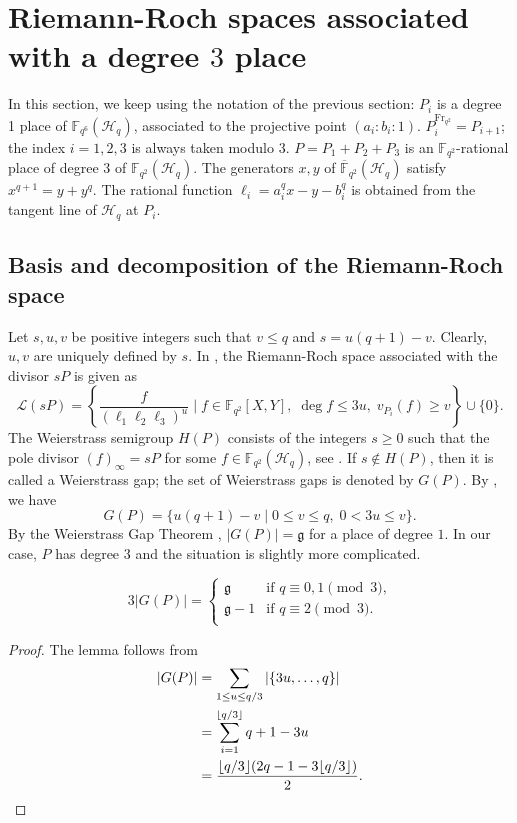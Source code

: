 \documentclass[entropy,article,submit,pdftex,moreauthors]{Definitions/mdpi}
\newcommand{\Frob}{{\mathrm{Fr}_{q^2}}}
\newcommand{\g}{\mathfrak{g}}
\begin{document}
\section{Riemann-Roch spaces associated with a degree $3$ place} \label{sec:riemann-roch}
In this section, we keep using the notation of the previous section: $P_i$ is a degree 1 place of $\mathbb{F}_{q^6}(\mathscr{H}_q)$, associated to the projective point $(a_i:b_i:1)$. $P_i^\Frob=P_{i+1}$; the index $i=1,2,3$ is always taken modulo $3$. $P=P_1+P_2+P_3$ is an $\mathbb{F}_{q^2}$-rational place of degree $3$ of $\mathbb{F}_{q^2}(\mathscr{H}_q)$. The generators $x,y$ of $\overline{\mathbb{F}}_{q^2}(\mathscr{H}_q)$ satisfy $x^{q+1}=y+y^q$. The rational function $\ell_i=a_i^qx-y-b_i^q$ is obtained from the tangent line of $\mathscr{H}_q$ at $P_i$. 

\subsection{Basis and decomposition of the Riemann-Roch space}
Let $s,u,v$ be positive integers such that $v\leq q$ and $s=u(q+1)-v$. Clearly, $u,v$ are uniquely defined by $s$. In \cite{korchmaros2013hermitian}, the Riemann-Roch space associated with the divisor $sP$ is given as
\[\mathscr{L}(sP) = \left\{ \frac{f}{(\ell_1\ell_2\ell_3)^u} \mid f \in \mathbb{F}_{q^2}[X,Y], \; \deg f \leq 3u, \; v_{P_i}(f) \geq v \right\} \cup \{0\}.\]
The Weierstrass semigroup $H(P)$ consists of the integers $s\geq 0$ such that the pole divisor $(f)_\infty=sP$ for some $f\in {\mathbb{F}_{q^2}}(\mathscr{H}_q)$, see \cite{beelen2023weierstrass}. If $s\not\in H(P)$, then it is called a Weierstrass gap; the set of Weierstrass gaps is denoted by $G(P)$. By \cite[Theorem 3.1]{korchmaros2013hermitian}, we have
\[G(P) = \{u(q+1)-v \mid 0\leq v\leq q, \; 0<3u\leq v\}.\]
By the Weierstrass Gap Theorem \cite[Theorem 1.6.8]{stichtenoth2009algebraic}, $|G(P)|=\g$ for a place of degree $1$. In our case, $P$ has degree $3$ and the situation is slightly more complicated.

\begin{Lemma} \label{lm:GP-size}
\[3|G(P)| = \begin{cases}
\g & \text{if $q\equiv 0,1 \pmod3$,} \\
\g-1 & \text{if $q\equiv 2 \pmod3$.} \\
\end{cases}\]
\end{Lemma}
\begin{proof}
The lemma follows from
\begin{align*}
|G(P)| &= \sum_{1 \leq u \leq q/3} |\{3u,\ldots,q\}| \\
&= \sum_{i=1}^{\lfloor q/3 \rfloor} q+1-3u \\
&= \frac{\lfloor q/3 \rfloor(2q-1-3\lfloor q/3 \rfloor)}{2}. \qedhere
\end{align*}
\end{proof}
\end{document}
